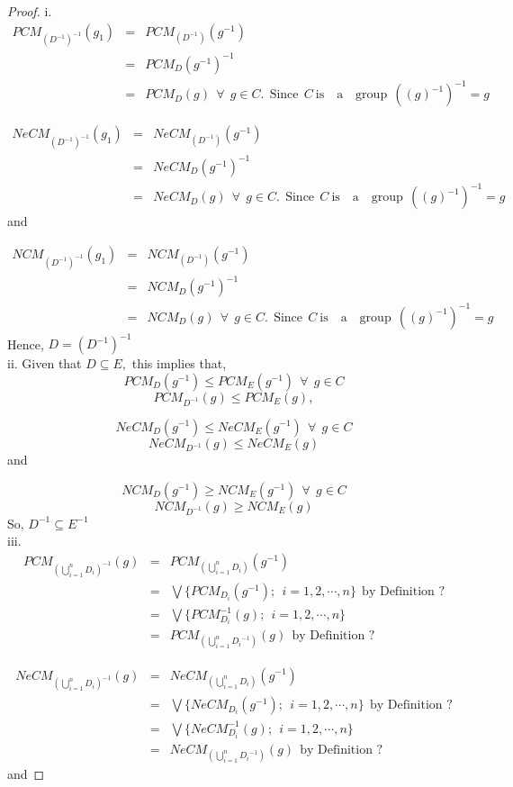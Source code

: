 \documentclass[10pt,a4paper]{amsart}
\newcommand{\dis}{\displaystyle}
\begin{document}
\begin{proof}
i.
\begin{eqnarray*}
PCM_{(D^{-1})^{-1}}(g_1) & = & PCM_{(D^{-1})}(g^{-1})\\
& = & PCM_D(g^{-1})^{-1} \\
& = & PCM_D(g)~~ \forall~~ g \in C.~~ \text{Since}~~ C ~ \text{is~~ a~~ group}~~((g)^{-1})^{-1} = g
\end{eqnarray*}

\begin{eqnarray*}
NeCM_{(D^{-1})^{-1}}(g_1) & = & NeCM_{(D^{-1})}(g^{-1})\\
& = & NeCM_D(g^{-1})^{-1} \\
& = & NeCM_D(g)~~ \forall~~ g \in C.~~ \text{Since}~~ C ~ \text{is~~ a~~ group}~~((g)^{-1})^{-1} = g
\end{eqnarray*} and 

\begin{eqnarray*}
NCM_{(D^{-1})^{-1}}(g_1) & = & NCM_{(D^{-1})}(g^{-1})\\
& = & NCM_D(g^{-1})^{-1} \\
& = & NCM_D(g)~~ \forall~~ g \in C.~~ \text{Since}~~ C ~ \text{is~~ a~~ group}~~((g)^{-1})^{-1} = g
\end{eqnarray*}
Hence, $D = (D^{-1})^{-1}$\\

ii. Given that $D \subseteq E,$ this implies that, 
$$PCM_{D}(g^{-1}) \leq PCM_{E}(g^{-1})~~ \forall~~ g \in C$$
$$PCM_{D^{-1}}(g) \leq PCM_{E}(g),$$

$$NeCM_{D}(g^{-1}) \leq NeCM_{E}(g^{-1})~~ \forall~~ g \in C$$
$$NeCM_{D^{-1}}(g) \leq NeCM_{E}(g)$$ and 

$$NCM_{D}(g^{-1}) \geq NCM_{E}(g^{-1})~~ \forall~~ g \in C$$
$$NCM_{D^{-1}}(g) \geq NCM_{E}(g)$$ So, $D^{-1} \subseteq E^{-1}$\\

iii. \begin{eqnarray*}
PCM_{\dis \left(\bigcup^n_{i = 1} D_i\right)^{-1}}(g) & = & PCM_{\dis \left(\bigcup^n_{i = 1} D_i\right)}(g^{-1})\\
& = & \bigvee \lbrace  PCM_{D_i}(g^{-1});~~ i = 1, 2, \cdots, n \rbrace~~ \text{by~Definition ?} \\
& = & \bigvee \lbrace  PCM_{D_i}^{-1}(g);~~ i = 1, 2, \cdots, n \rbrace\\
& = & PCM_{\dis \left(\bigcup^n_{i = 1} {D_i}^{-1}\right)}(g)~~ \text{by~Definition ?}
\end{eqnarray*}

\begin{eqnarray*}
NeCM_{\dis \left(\bigcup^n_{i = 1} D_i\right)^{-1}}(g) & = & NeCM_{\dis \left(\bigcup^n_{i = 1} D_i\right)}(g^{-1})\\
& = & \bigvee \lbrace  NeCM_{D_i}(g^{-1});~~ i = 1, 2, \cdots, n \rbrace~~ \text{by~Definition ?} \\
& = & \bigvee \lbrace  NeCM_{D_i}^{-1}(g);~~ i = 1, 2, \cdots, n \rbrace\\
& = & NeCM_{\dis \left(\bigcup^n_{i = 1} {D_i}^{-1}\right)}(g)~~ \text{by~Definition ?}
\end{eqnarray*}
and


\end{proof}
\end{document}
